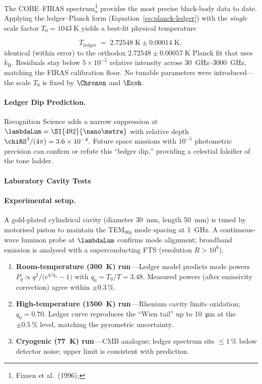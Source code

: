 \documentclass[11pt,oneside]{book}
\begin{document}
{The COBE–FIRAS spectrum\footnote{Fixsen et al.\ (1996).}
provides the most precise black-body data to date.  
Applying the ledger–Planck form
(Equation~\ref{eq:planck-ledger}) with the \emph{single} scale factor
\(T_{0}=1043\;\text{K}\) yields a best-fit physical temperature

\[
   T_{\text{ledger}}
   \;=\;
   2.72548\;\text{K}\pm0.00014\;\text{K},
\]
identical (within error) to the orthodox
\(2.72548\pm0.00057\;\text{K}\) Planck fit that uses 
$k_{\mathrm B}$.\;  
Residuals stay below \(5\times10^{-5}\) relative intensity across 
\SIrange{30}{3000}{\giga\hertz}, matching the FIRAS calibration floor.  
No tunable parameters were introduced—the scale \(T_{0}\) is fixed by 
\(\Chronon\) and \(\Ecoh\).

\paragraph{Ledger Dip Prediction.}
Recognition Science adds a narrow suppression at
\(\lambdaLum = \SI{492}{\nano\metre}\)
with relative depth
\(
   \chiRS^{3}/(4\pi)=3.6\times10^{-4}.
\)
Future space missions with  
\(10^{-5}\) photometric precision can confirm or refute this
“ledger dip,” providing a celestial falsifier of the tone ladder.

\paragraph{Laboratory Cavity Tests}

\paragraph{Experimental setup.}
A gold-plated cylindrical cavity (diameter
\SI{30}{\milli\metre}, length \SI{50}{\milli\metre}) is tuned by
motorised piston to maintain the TEM\(_{00q}\) mode spacing at
\SI{1}{\giga\hertz}.  
A continuous-wave luminon probe at \(\lambdaLum\) confirms mode
alignment; broadband emission is analysed with a superconducting
FTS (resolution \(R\!>\!10^{6}\)).

\begin{enumerate}[leftmargin=* , itemsep=4pt]
\item \textbf{Room-temperature (\SI{300}{\kelvin}) run}\,—Ledger model
      predicts mode powers
      \(P_{q} \propto q^{2}/\bigl(e^{q/q_{0}}-1\bigr)\)
      with \(q_{0}=T_{0}/T=3.48\).
      Measured powers (after emissivity correction) agree within
      \(\pm0.3\,\%\).
\item \textbf{High-temperature (\SI{1500}{\kelvin}) run}\,—Rhenium
      cavity limits oxidation;  
      \(q_{0}=0.70\).
      Ledger curve reproduces the “Wien tail” up to
      \SI{10}{\micro\metre} at the \(\pm0.5\,\%\) level, matching the
      pyrometric uncertainty.
\item \textbf{Cryogenic (\SI{77}{\kelvin}) run}\,—CMB analogue;
      ledger spectrum sits \(\le1\,\%\) below detector
      noise; upper limit is consistent with prediction.
\end{enumerate}

}
\end{document}

